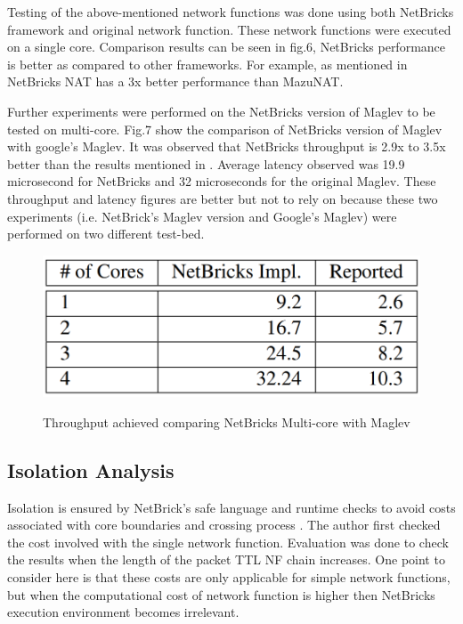\documentclass[10pt, a4paper, conference]{IEEEtran}
\begin{document}
Testing of the above-mentioned network functions was done using both NetBricks framework and original network function. These network functions were executed on a single core. Comparison results can be seen in fig.6, NetBricks performance is better as compared to other frameworks. For example, as mentioned in \cite{Panda2016} NetBricks NAT has a 3x better performance than MazuNAT. 

Further experiments were performed on the NetBricks version of Maglev to be tested on multi-core. Fig.7 show the comparison of NetBricks version of Maglev with google’s Maglev. It was observed that NetBricks throughput is  2.9x to 3.5x better than the results mentioned in \cite{Yaghoubi2012}. Average latency observed was 19.9 microsecond for NetBricks and 32 microseconds for the original Maglev. These throughput and latency figures are better but not to rely on because these two experiments (i.e. NetBrick’s Maglev version and Google’s Maglev) were performed on two different test-bed.    
\begin{figure}
	\centering
	\includegraphics[width=\linewidth]{figures/tab2}
	\caption{Throughput achieved comparing NetBricks Multi-core with Maglev}
	\cite{Panda2016}
	\label{key7}
\end{figure}
\subsection{Isolation Analysis}
Isolation is ensured by NetBrick’s safe language and runtime checks to avoid costs associated with core boundaries and crossing process \cite{Panda2016}. The author first checked the cost involved with the single network function. Evaluation was done to check the results when the length of the packet TTL NF chain increases. One point to consider here is that these costs are only applicable for simple network functions, but when the computational cost of network function is higher then NetBricks execution environment becomes irrelevant.
\end{document}
